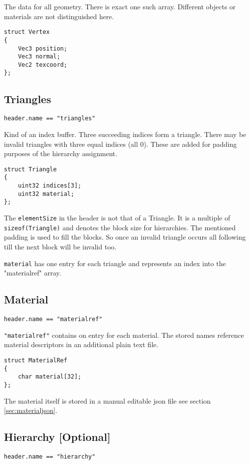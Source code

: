 \documentclass[english,10pt,a4paper,twocolumn,colorscheme=green]{orarticle}
\begin{document}
	The data for all geometry. There is exact one such array. Different objects
	or materials are not distinguished here.
	\begin{lstlisting}
struct Vertex
{
	Vec3 position;
	Vec3 normal;
	Vec2 texcoord;
};
	\end{lstlisting}
	
	\subsection{Triangles}
	\lstinline|header.name == "triangles"|
	
	Kind of an index buffer. Three succeeding indices form a triangle. There may be invalid triangles with three equal indices (all 0). These are added for padding purposes of the hierarchy assignment.
	\begin{lstlisting}
struct Triangle
{
	uint32 indices[3];
	uint32 material;
};
	\end{lstlisting}
	The \lstinline|elementSize| in the header is not that of a Triangle. It is a multiple of \lstinline|sizeof(Triangle)| and denotes the block size for hierarchies. The mentioned padding is used to fill the blocks. So once an invalid triangle occurs all following till the next block will be invalid too.
	
	\lstinline|material| has one entry for each triangle and represents an index into the "materialref" array.
	
	\subsection{Material}
	\lstinline|header.name == "materialref"|
	
	\lstinline|"materialref"| contains on entry for each material. The stored names reference material descriptors in an additional plain text file.
	
	\begin{lstlisting}
struct MaterialRef
{
	char material[32];
};
	\end{lstlisting}
	The material itself is stored in a manual editable json file see section \ref{sec:materialjson}.
	
	\subsection{Hierarchy [Optional]}
	\lstinline|header.name == "hierarchy"|
	
\end{document}

